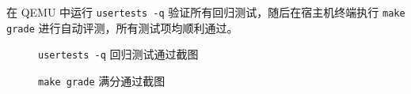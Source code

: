 \documentclass[12pt, a4paper]{ctexart}
\begin{document}
在 QEMU 中运行 \texttt{usertests -q} 验证所有回归测试，随后在宿主机终端执行 \texttt{make grade} 进行自动评测，所有测试项均顺利通过。

\begin{figure}[H]
    \centering
    \caption{\texttt{usertests -q} 回归测试通过截图}
    \label{fig:usertests}
\end{figure}

\begin{figure}[H]
    \centering
    \caption{\texttt{make grade} 满分通过截图}
    \label{fig:make_grade}
\end{figure}
\end{document}
